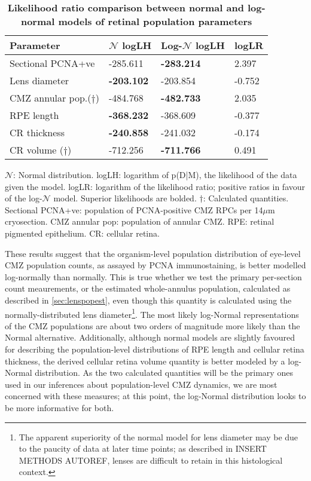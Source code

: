 \begin{table}[!ht]
    \centering
    \caption{
    {\bf Likelihood ratio comparison between normal and log-normal models of retinal population parameters}}
    \begin{tabular}{|l|l|l|l|}
    \hline
    {\bf Parameter} & {\bf $\mathcal{N}$ logLH} & {\bf Log-$\mathcal{N}$ logLH} & {\bf logLR} \\ \hline
    Sectional PCNA+ve & -285.611 & {\bf -283.214} & 2.397\\ \hline
    Lens diameter & {\bf -203.102} & -203.854 & -0.752\\ \hline
    CMZ annular pop.($\dagger$)  & -484.768 & {\bf -482.733} & 2.035\\ \hline
    RPE length & {\bf -368.232} & -368.609 & -0.377\\ \hline
    CR thickness & {\bf -240.858} & -241.032 & -0.174\\ \hline
    CR volume ($\dagger$) & -712.256 & {\bf -711.766} & 0.491\\ \hline
    \end{tabular}
    \begin{flushleft} $\mathcal{N}$: Normal distribution. logLH: logarithm of p(D|M), the likelihood of the data given the model. logLR: logarithm of the likelihood ratio; positive ratios in favour of the log-$\mathcal{N}$ model. Superior likelihoods are bolded. $\dagger$: Calculated quantities. Sectional PCNA+ve: population of PCNA-positive CMZ RPCs per 14$\mu$m cryosection. CMZ annular pop: population of annular CMZ. RPE: retinal pigmented epithelium. CR: cellular retina.
    \end{flushleft}
    \label{PLHRtable}
\end{table}

These results suggest that the organism-level population distribution of eye-level CMZ population counts, as assayed by PCNA immunostaining, is better modelled log-normally than normally. This is true whether we test the primary per-section count meaurements, or the estimated whole-annulus population, calculated as described in \autoref{sec:lenspopest}, even though this quantity is calculated using the normally-distributed lens diameter\footnote{The apparent superiority of the normal model for lens diameter may be due to the paucity of data at later time points; as described in INSERT METHODS AUTOREF, lenses are difficult to retain in this histological context.}. The most likely log-Normal representations of the CMZ populations are about two orders of magnitude more likely than the Normal alternative. Additionally, although normal models are slightly favoured for describing the population-level distributions of RPE length and cellular retina thickness, the derived cellular retina volume quantity is better modeled by a log-Normal distribution. As the two calculated quantities will be the primary ones used in our inferences about population-level CMZ dynamics, we are most concerned with these measures; at this point, the log-Normal distribution looks to be more informative for both.

